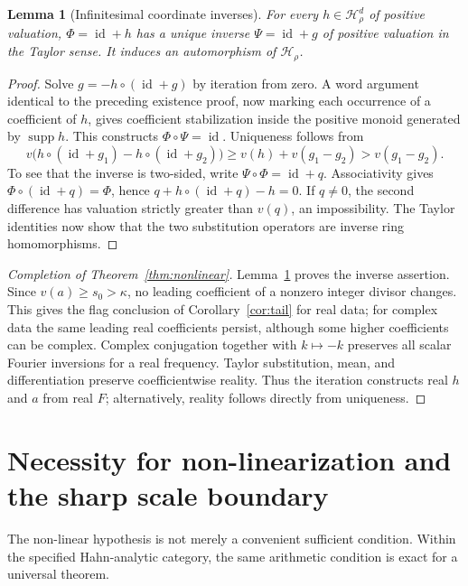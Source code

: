 \documentclass[11pt,letterpaper]{article}
\newtheorem{lemma}[theorem]{Lemma}
\theoremstyle{definition}
\theoremstyle{remark}
\newcommand{\HH}{\mathcal H}
\newcommand{\supp}{\operatorname{supp}}
\newcommand{\id}{\operatorname{id}}
\numberwithin{equation}{section}
\begin{document}
\begin{lemma}[Infinitesimal coordinate inverses]\label{lem:coordinate-inverse}
For every $h\in\HH_\rho^d$ of positive valuation, $\Phi=\id+h$ has a
unique inverse $\Psi=\id+g$ of positive valuation in the Taylor sense.
It induces an automorphism of $\HH_\rho$.
\end{lemma}
\begin{proof}
Solve $g=-h\circ(\id+g)$ by iteration from zero.  A word argument identical
to the preceding existence proof, now marking each occurrence of a
coefficient of $h$, gives coefficient stabilization inside the positive
monoid generated by $\supp h$.  This constructs $\Phi\circ\Psi=\id$.
Uniqueness follows from
\[
 v\bigl(h\circ(\id+g_1)-h\circ(\id+g_2)\bigr)
 \ge v(h)+v(g_1-g_2)>v(g_1-g_2).
\]
To see that the inverse is two-sided, write $\Psi\circ\Phi=\id+q$.
Associativity gives $\Phi\circ(\id+q)=\Phi$, hence
$q+h\circ(\id+q)-h=0$.  If $q\ne0$, the second difference has valuation
strictly greater than $v(q)$, an impossibility.  The Taylor identities now
show that the two substitution operators are inverse ring homomorphisms.
\end{proof}

\begin{proof}[Completion of Theorem~\ref{thm:nonlinear}]
Lemma~\ref{lem:coordinate-inverse} proves the inverse assertion.
Since $v(a)\ge s_0>\kappa$, no leading coefficient of a nonzero integer
divisor changes.  This gives the flag conclusion of Corollary~\ref{cor:tail}
for real data; for complex data the same leading real coefficients persist,
although some higher coefficients can be complex.  Complex conjugation together with $k\mapsto-k$
preserves all scalar Fourier inversions for a real frequency.  Taylor
substitution, mean, and differentiation preserve coefficientwise reality.
Thus the iteration constructs real $h$ and $a$ from real $F$; alternatively,
reality follows directly from uniqueness.
\end{proof}

\section{Necessity for non-linearization and the sharp scale boundary}
\label{sec:necessity}

The non-linear hypothesis is not merely a convenient sufficient condition.
Within the specified Hahn-analytic category, the same arithmetic condition
is exact for a universal theorem.
\end{document}
